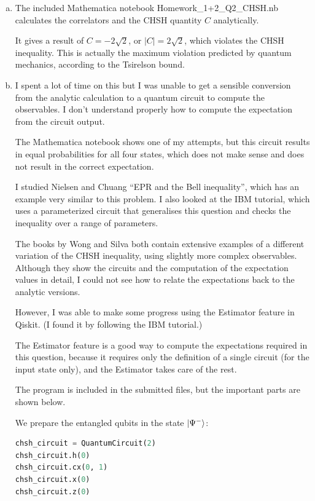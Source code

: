 \documentclass[12pt]{extarticle}
\begin{document}
\begin{enumerate}[(a)]
\item
The included Mathematica notebook Homework\_1+2\_Q2\_CHSH.nb calculates the correlators and the CHSH quantity $C$ analytically.

It gives a result of $C = -2\sqrt{2}$, or $|C| = 2\sqrt{2}$, which violates the CHSH inequality.
This is actually the maximum violation predicted by quantum mechanics, according to the Tsirelson bound.

\item
I spent a lot of time on this but I was unable to get a sensible conversion from the analytic calculation to a quantum circuit
to compute the observables.
I don't understand properly how to compute the expectation from the circuit output.

The Mathematica notebook shows one of my attempts, but this circuit results in equal probabilities for all four states, which does not make sense and does not result in the correct expectation.

I studied Nielsen and Chuang\cite{nielsen2016} ``EPR and the Bell inequality'', which has an example very similar to this problem.
I also looked at the IBM tutorial\cite{ibm_chsh}, which uses a parameterized circuit that generalises this question and checks the inequality over a range of parameters.

The books by Wong\cite{wong2022} and Silva\cite{silva2024} both contain extensive examples of a different variation of the CHSH inequality, using slightly more complex observables.
Although they show the circuits and the computation of the expectation values in detail, I could not see how to relate the expectations back to the analytic versions.

However, I was able to make some progress using the Estimator feature in Qiskit.
(I found it by following the IBM tutorial.)

The Estimator feature is a good way to compute the expectations required in this question,
because it requires only the definition of a single circuit (for the input state only),
and the Estimator takes care of the rest.

The program is included in the submitted files, but the important parts are shown below.

We prepare the entangled qubits in the state $\ket{\Psi^{-}}$:
\begin{lstlisting}[language=python]
chsh_circuit = QuantumCircuit(2)
chsh_circuit.h(0)
chsh_circuit.cx(0, 1)
chsh_circuit.x(0)
chsh_circuit.z(0)
\end{lstlisting}


\end{enumerate}
\end{document}
